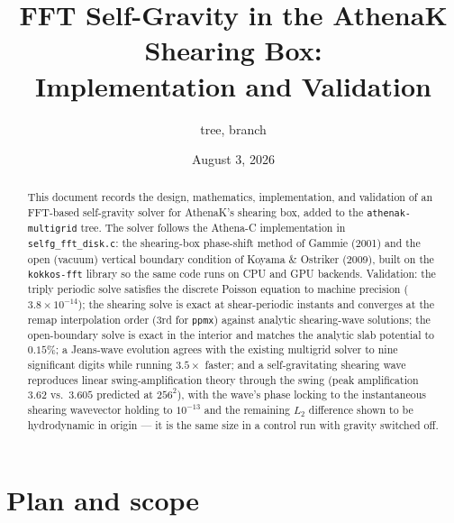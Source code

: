 \documentclass[11pt]{article}
\title{FFT Self-Gravity in the AthenaK Shearing Box:\\
       Implementation and Validation}
\author{\code{athenak-multigrid} tree, branch \code{multigrid}}
\date{August 3, 2026}
\newcommand{\code}[1]{\texttt{#1}}
\begin{document}
\maketitle

\begin{abstract}
\noindent
This document records the design, mathematics, implementation, and validation of an
FFT-based self-gravity solver for AthenaK's shearing box, added to the
\code{athenak-multigrid} tree. The solver follows the Athena-C implementation in
\code{selfg\_fft\_disk.c}: the shearing-box phase-shift method of Gammie (2001) and the
open (vacuum) vertical boundary condition of Koyama \& Ostriker (2009), built on the
\code{kokkos-fft} library so the same code runs on CPU and GPU backends. Validation:
the triply periodic solve satisfies the discrete Poisson equation to machine precision
($3.8\times10^{-14}$); the shearing solve is exact at shear-periodic instants and
converges at the remap interpolation order (3rd for \code{ppmx}) against analytic
shearing-wave solutions; the open-boundary solve is exact in the interior and matches
the analytic slab potential to $0.15\%$; a Jeans-wave evolution agrees with the
existing multigrid solver to nine significant digits while running $3.5\times$ faster;
and a self-gravitating shearing wave reproduces linear swing-amplification theory
through the swing (peak amplification $3.62$ vs.\ $3.605$ predicted at $256^2$),
with the wave's phase locking to the instantaneous shearing wavevector holding to
$10^{-13}$ and the remaining $L_2$ difference shown to be hydrodynamic in origin
--- it is the same size in a control run with gravity switched off.
\end{abstract}

\tableofcontents

\section{Plan and scope}
\end{document}
